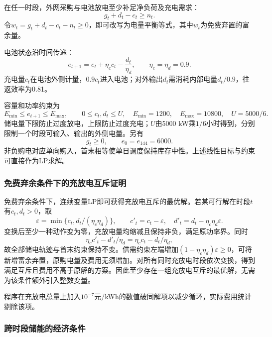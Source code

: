 在任一时段，外网采购与电池放电至少补足净负荷及充电需求：
\begin{equation}
 g_t+d_t-c_t\ge n_t.
 \label{eq:balance}
\end{equation}
令$w_t=g_t+d_t-c_t-n_t\ge0$，即可改写为电量平衡等式，其中$w_t$为免费弃置的富余量。

电池状态沿时间传递：
\begin{equation}
 e_{t+1}=e_t+\eta_cc_t-\frac{d_t}{\eta_d},
 \qquad \eta_c=\eta_d=0.9.
 \label{eq:soc}
\end{equation}
充电量$c_t$在电池外侧计量，$0.9c_t$进入电池；对外输出$d_t$需消耗内部电量$d_t/0.9$，往返效率为0.81。

容量和功率约束为
\begin{equation}
 E_{\min}\le e_{t+1}\le E_{\max},\qquad
 0\le c_t,d_t\le U,
 \quad E_{\min}=1200,\quad E_{\max}=10800,\quad U=5000/6.
 \label{eq:limits}
\end{equation}
储电量下限防止过度放电，上限防止过度充电；$U$由5000 kW乘$1/6$小时得到，分别限制一个时段可输入、输出的外侧电量。另有
\begin{equation}
 g_t\ge0,\qquad e_0=e_{144}=6000.
 \label{eq:terminal_q1}
\end{equation}
非负购电对应单向购入，首末相等使单日调度保持库存中性。上述线性目标与约束可直接作为LP求解。

\subsubsection{免费弃余条件下的充放电互斥证明}

免费弃余条件下，连续变量LP即可获得充放电互斥的最优解。若某可行解在时段$t$有$c_t,d_t>0$，取
\begin{equation}
 \varepsilon=\min\{c_t,d_t/(\eta_c\eta_d)\},\qquad
 c'_t=c_t-\varepsilon,\quad
 d'_t=d_t-\eta_c\eta_d\varepsilon.
 \label{eq:q1_remove_simultaneous}
\end{equation}
变换后至少一种动作变为零，充放电量均缩减且保持非负，满足原功率界。同时
\[
 \eta_cc'_t-d'_t/\eta_d=\eta_cc_t-d_t/\eta_d,
\]
故全部储电轨迹与首末约束保持不变。供需约束左端增加$(1-\eta_c\eta_d)\varepsilon\ge0$，可将新增富余弃置，原购电量及费用无须增加。对所有同时充放电时段依次变换，得到满足互斥且费用不高于原解的方案。因此至少存在一组充放电互斥的最优解，无需为该条件额外引入整数变量。

程序在充放电总量上加入$10^{-7}$元/kWh的数值破同解项以减少循环，实际费用统计剔除该项。

\subsubsection{跨时段储能的经济条件}

